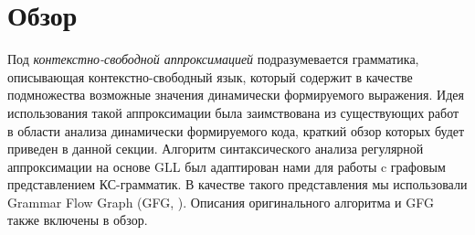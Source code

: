 \section{Обзор}



Под \textit{контекстно-свободной аппроксимацией} подразумевается грамматика, описывающая контекстно-свободный язык, который содержит в качестве подмножества возможные значения динамически формируемого выражения. Идея использования такой аппроксимации была заимствована из существующих работ в области анализа динамически формируемого кода, краткий обзор которых будет приведен в данной секции. Алгоритм синтаксического анализа регулярной аппроксимации на основе GLL был адаптирован нами для работы c графовым представлением КС-грамматик. В качестве такого представления мы использовали Grammar Flow Graph (GFG, \cite{gfg}). Описания оригинального алгоритма и GFG также включены в обзор. 


